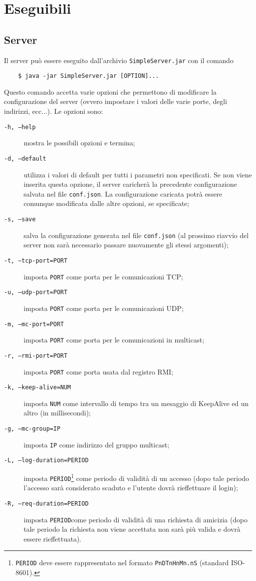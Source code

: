 \documentclass[11pt]{article}
\begin{document}
\section{Eseguibili}

\subsection{Server}
Il server può essere eseguito dall'archivio {\tt SimpleServer.jar} con il
comando

\begin{verbatim}
	$ java -jar SimpleServer.jar [OPTION]...
\end{verbatim}

Questo comando accetta varie opzioni che permettono di modificare la
configurazione del server (ovvero impostare i valori delle varie porte, degli
indirizzi, ecc...). Le opzioni sono:

\begin{description}
	\item [{\tt -h, --help}] mostra le possibili opzioni e termina;
	\item [{\tt -d, --default}] utilizza i valori di default per tutti i
	parametri non specificati. Se non viene inserita questa opzione, il server
	caricherà la precedente configurazione salvata nel file {\tt conf.json}.
	La configurazione caricata potrà essere comunque modificata dalle altre
	opzioni, se specificate;
	\item [{\tt -s, --save}] salva la configurazione generata nel file
	{\tt conf.json} (al prossimo riavvio del server non sarà necessario passare
	nuovamente gli stessi argomenti);
	\item [{\tt -t, --tcp-port=PORT}] imposta {\tt PORT} come porta per le
	comunicazioni TCP;
	\item [{\tt -u, --udp-port=PORT}] imposta {\tt PORT} come porta per le
	comunicazioni UDP;
	\item [{\tt -m, --mc-port=PORT}] imposta {\tt PORT} come porta per le
	comunicazioni in multicast;
	\item [{\tt -r, --rmi-port=PORT}] imposta {\tt PORT} come porta usata dal
	registro RMI;
	\item [{\tt -k, --keep-alive=NUM}] imposta {\tt NUM} come intervallo di
	tempo tra un mesaggio di KeepAlive ed un altro (in millisecondi);
	\item [{\tt -g, --mc-group=IP}] imposta {\tt IP} come indirizzo del gruppo
	multicast;
	\item [{\tt -L, --log-duration=PERIOD}] imposta {\tt PERIOD}\footnote
	{{\tt PERIOD} deve essere rappresentato nel formato {\tt PnDTnHnMn.nS}
	(standard ISO-8601).} come periodo di validità di un accesso (dopo tale
	periodo l'accesso sarà considerato scaduto e l'utente dovrà rieffettuare
	il login);
	\item [{\tt -R, --req-duration=PERIOD}] imposta {\tt PERIOD}\footnotemark
	[\value{footnote}] come periodo di validità di una richiesta di amicizia
	(dopo tale periodo la richiesta non viene accettata non sarà più valida e
	dovrà essere rieffettuata).
\end{description}
\end{document}
